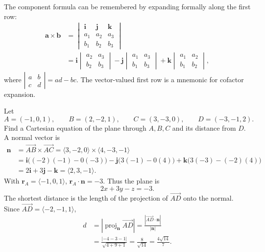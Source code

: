 The component formula can be remembered by expanding formally along the first row:
\begin{align*}
 \mathbf a\times\mathbf b
 &=\begin{vmatrix}
 \mathbf i&\mathbf j&\mathbf k\\a_1&a_2&a_3\\b_1&b_2&b_3
 \end{vmatrix}\\
 &=\mathbf i\begin{vmatrix}a_2&a_3\\b_2&b_3\end{vmatrix}
 -\mathbf j\begin{vmatrix}a_1&a_3\\b_1&b_3\end{vmatrix}
 +\mathbf k\begin{vmatrix}a_1&a_2\\b_1&b_2\end{vmatrix},
\end{align*}
where $\left|\begin{smallmatrix}a&b\\c&d\end{smallmatrix}\right|=ad-bc$.
The vector-valued first row is a mnemonic for cofactor expansion.

\begin{example}
Let
\[
 A=(-1,0,1),\qquad B=(2,-2,1),\qquad C=(3,-3,0),\qquad D=(-3,-1,2).
\]
Find a Cartesian equation of the plane through $A,B,C$ and its distance from $D$.
A normal vector is
\begin{align*}
 \mathbf n
 &=\overrightarrow{AB}\times\overrightarrow{AC}
 =\langle3,-2,0\rangle\times\langle4,-3,-1\rangle\\
 &=\mathbf i\bigl((-2)(-1)-0(-3)\bigr)
 -\mathbf j\bigl(3(-1)-0(4)\bigr)
 +\mathbf k\bigl(3(-3)-(-2)(4)\bigr)\\
 &=2\mathbf i+3\mathbf j-\mathbf k=\langle2,3,-1\rangle.
\end{align*}
With $\mathbf r_A=\langle-1,0,1\rangle$,
$\mathbf r_A\cdot\mathbf n=-3$. Thus the plane is
\[
 \boxed{2x+3y-z=-3}.
\]
The shortest distance is the length of the projection of $\overrightarrow{AD}$
onto the normal. Since $\overrightarrow{AD}=\langle-2,-1,1\rangle$,
\begin{align*}
 d
 &=\left|\operatorname{proj}_{\mathbf n}\overrightarrow{AD}\right|
 =\frac{|\overrightarrow{AD}\cdot\mathbf n|}{|\mathbf n|}\\
 &=\frac{|-4-3-1|}{\sqrt{4+9+1}}
 =\frac8{\sqrt{14}}=\boxed{\frac{4\sqrt{14}}7}.
\end{align*}
\end{example}


